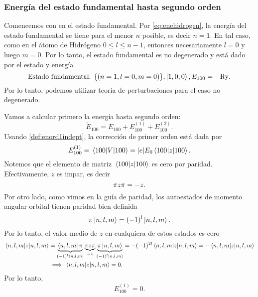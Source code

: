 \documentclass[10pt, a4paper]{article}
\newcommand{\Ry}{\ensuremath{\text{Ry}}}
\numberwithin{equation}{subsection}
\begin{document}
\subsubsection{Energía del estado fundamental hasta segundo orden}

Comencemos con en el estado fundamental. Por \eqref{eq:enehidrogen}, la energía
del estado fundamental se tiene para el menor $n$ posible, es decir $n = 1$.
En tal caso, como en el átomo de Hidrógeno $0 \leq l \leq n - 1$, entonces
necesariamente $l = 0$ y luego $m = 0$. Por lo tanto, el estado fundamental es
no degenerado y está dado por el estado y energía
\begin{equation}
  \text{Estado fundamental: } \set{(n=1,l=0,m=0)}, \ket{1,0,0}, E_{100} = -\Ry.
\end{equation}
Por lo tanto, podemos utilizar teoría de perturbaciones para el caso no
degenerado.

Vamos a calcular primero la energía hasta segundo orden:
\begin{equation}
  \tilde{E}_{100} = E_{100} + E^{(1)}_{100} + E^{(2)}_{100}.
\end{equation}
Usando \eqref{def:enord1indept}, la corrección de primer orden está dada por
\begin{equation}
  E^{(1)}_{100} = \matrixel{100}{V}{100} = \abs{e}E_0\matrixel{100}{z}{100}.
\end{equation}
Notemos que el elemento de matriz $\matrixel{100}{z}{100}$ es cero por paridad.
Efectivamente, $z$ es impar, es decir
\begin{equation}
  \pi z \pi = -z.
\end{equation}
Por otro lado, como vimos en la guía de paridad, los autoestados de momento
angular orbital tienen paridad bien definida
\begin{equation}
  \pi \ket{n,l,m} = (-1)^{l}\ket{n,l,m}.
\end{equation}
Por lo tanto, el valor medio de $z$ en cualquiera de estos estados es cero
\begin{align}
  \matrixel{n,l,m}{z}{n,l,m} &=
    \underbrace{\bra{n,l,m}\parityop}_{(-1)^l\bra{n,l,m}} \underbrace{\parityop
    z \parityop}_{-z} \underbrace{\parityop\ket{n,l,m}}_{(-1)^l\ket{n,l,m}} =
    -(-1)^{2l} \matrixel{n,l,m}{z}{n,l,m} = -\matrixel{n,l,m}{z}{n,l,m} \\
  &\implies \matrixel{n,l,m}{z}{n,l,m} = 0.
\end{align}
Por lo tanto,
\begin{equation}
  E^{(1)}_{100} = 0.
\end{equation}
\end{document}

